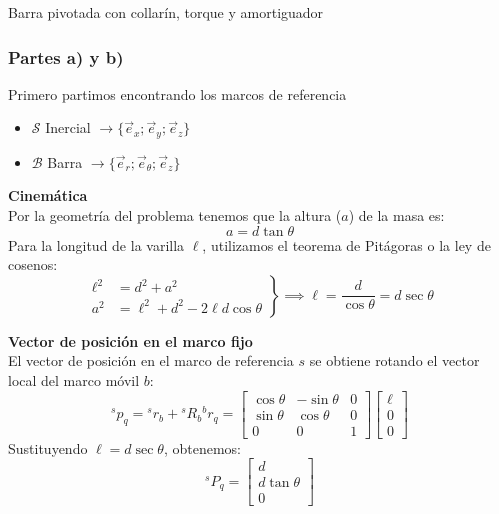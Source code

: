 \begin{solucion}{Barra pivotada con collarín, torque y amortiguador}

\subsubsection*{Partes a) y b)}

Primero partimos encontrando los marcos de referencia
\begin{itemize}
    \item $\mathcal{S}$ Inercial $\longrightarrow\{\vec{e}_x;\vec{e}_y;\vec{e}_z\}$
    \item $\mathcal{B}$ Barra $\longrightarrow\{\vec{e}_r;\vec{e}_\theta;\vec{e}_z\}$
\end{itemize}

\textbf{Cinemática}\\
Por la geometría del problema tenemos que la altura ($a$) de la masa es:
$$a = d \tan \theta$$
Para la longitud de la varilla $\ell$, utilizamos el teorema de Pitágoras o la ley de cosenos:
$$
\left.
\begin{aligned}
    \ell^2 &= d^2 + a^2 \\
    a^2 &= \ell^2 + d^2 - 2 \ell d \cos \theta
\end{aligned}
\right\} \implies \ell = \frac{d}{\cos \theta} = d \sec \theta
$$

\textbf{Vector de posición en el marco fijo}\\
El vector de posición en el marco de referencia $s$ se obtiene rotando el vector local del marco móvil $b$:
$$
{}^s p_q = {}^s r_b + {}^s R_b {}^b r_q =
\begin{bmatrix}
    \cos \theta & -\sin \theta & 0 \\
    \sin \theta & \cos \theta & 0 \\
    0 & 0 & 1
\end{bmatrix}
\begin{bmatrix}
    \ell \\ 0 \\ 0
\end{bmatrix}
$$
Sustituyendo $\ell = d \sec \theta$, obtenemos:
$$
{}^s P_q = \begin{bmatrix} d \\ d \tan \theta \\ 0 \end{bmatrix}
$$


\end{solucion}
